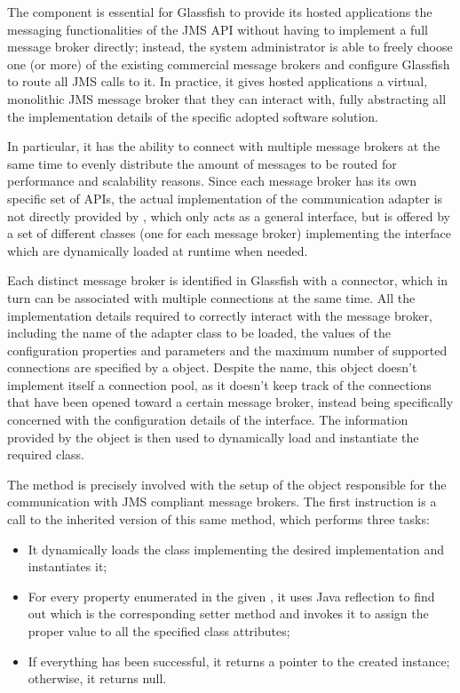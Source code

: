 The  component is essential for Glassfish to provide its hosted applications the messaging functionalities of the JMS API without having to implement a full message broker directly; instead, the system administrator is able to freely choose one (or more) of the existing commercial message brokers and configure Glassfish to route all JMS calls to it. In practice, it gives hosted applications a virtual, monolithic JMS message broker that they can interact with, fully abstracting all the implementation details of the specific adopted software solution.

In particular, it has the ability to connect with multiple message brokers at the same time to evenly distribute the amount of messages to be routed for performance and scalability reasons. Since each message broker has its own specific set of APIs, the actual implementation of the communication adapter is not directly provided by , which only acts as a general interface, but is offered by a set of different classes (one for each message broker) implementing the  interface which are dynamically loaded at runtime when needed.

Each distinct message broker is identified in Glassfish with a connector, which in turn can be associated with multiple connections at the same time. All the implementation details required to correctly interact with the message broker, including the name of the adapter class to be loaded, the values of the configuration properties and parameters and the maximum number of supported connections are specified by a  object. Despite the name, this object doesn't implement itself a connection pool, as it doesn't keep track of the connections that have been opened toward a certain message broker, instead being specifically concerned with the configuration details of the interface. The information provided by the  object is then used to dynamically load and instantiate the required  class.

The  method is precisely involved with the setup of the  object responsible for the communication with JMS compliant message brokers. The first instruction is a call to the inherited version of this same method, which performs three tasks:
\begin{itemize}
	\item It dynamically loads the class implementing the desired  implementation and instantiates it;
	\item For every property enumerated in the given , it uses Java reflection to find out which is the corresponding setter method and invokes it to assign the proper value to all the specified class attributes;
	\item If everything has been successful, it returns a pointer to the created  instance; otherwise, it returns null.
\end{itemize}

